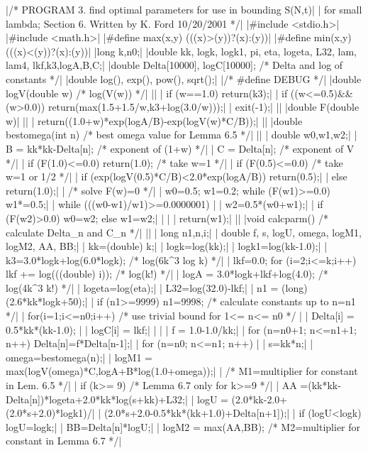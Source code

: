 {\beginlines
|/* PROGRAM 3.  find optimal parameters for use in bounding S(N,t)|
|   for small lambda; Section 6.  Written by K. Ford 10/20/2001 */|
|#include <stdio.h>|
|#include <math.h>|
|#define max(x,y) (((x)>(y))?(x):(y))|
|#define min(x,y) (((x)<(y))?(x):(y))|
|long k,n0;|
|double kk, logk, logk1, pi, eta, logeta, L32, lam, lam4, lkf,k3,logA,B,C;|
|double Delta[10000], logC[10000]; /* Delta and log of constants */|
|double log(), exp(), pow(), sqrt();|
|/* #define DEBUG  */|
|double logV(double w)   /* log(V(w))  */|
|{|
| if (w==1.0) return(k3);|
|  if ((w<=0.5)&&(w>0.0)) return(max(1.5+1.5/w,k3+log(3.0/w)));|
|  exit(-1);|
|}|
|double F(double w)|
|{|
|  return((1.0+w)*exp(logA/B)-exp(logV(w)*C/B));|
|}|
|double bestomega(int n)  /* best omega value for Lemma 6.5 */|
|{|
|  double w0,w1,w2;|
|  B = kk*kk-Delta[n];            /* exponent of (1+w) */|
|  C = Delta[n];                  /* exponent of V     */|
|  if (F(1.0)<=0.0) return(1.0);  /* take w=1          */|
|  if (F(0.5)<=0.0) {             /* take w=1 or 1/2   */|
|    if (exp(logV(0.5)*C/B)<2.0*exp(logA/B)) return(0.5);|
|    else return(1.0);|
|  }                              /* solve F(w)=0 */|
|  w0=0.5; w1=0.2; while (F(w1)>=0.0) w1*=0.5;|
|  while (((w0-w1)/w1)>=0.0000001) {|
|    w2=0.5*(w0+w1);|
|    if (F(w2)>0.0) w0=w2; else w1=w2;|
|  }|
|  return(w1);|
|}|
|void calcparm()   /* calculate Delta_n and C_n */|
|{|
|  long n1,n,i;|
|  double f, s, logU, omega, logM1, logM2, AA, BB;|
|  kk=(double) k;|
|  logk=log(kk);|
|  logk1=log(kk-1.0);|
|  k3=3.0*logk+log(6.0*logk);  /* log(6k^3 log k) */|
|  lkf=0.0; for (i=2;i<=k;i++) lkf += log(((double) i));  /* log(k!) */|
|  logA = 3.0*logk+lkf+log(4.0);  /* log(4k^3 k!)   */|
|  logeta=log(eta);|
|  L32=log(32.0)-lkf;|
|  n1 = (long) (2.6*kk*logk+50);|
|  if (n1>=9999) n1=9998;  /* calculate constants up to n=n1    */|
|  for(i=1;i<=n0;i++) {    /* use trivial bound for 1<= n<= n0  */ |
|    Delta[i] = 0.5*kk*(kk-1.0); |
|    logC[i] = lkf;|
|  }|
|  f = 1.0-1.0/kk;|
|  for (n=n0+1; n<=n1+1; n++) Delta[n]=f*Delta[n-1];|
|  for (n=n0; n<=n1; n++) {|
|    s=kk*n;|
|    omega=bestomega(n);|
|    logM1 = max(logV(omega)*C,logA+B*log(1.0+omega));|
|                     /* M1=multiplier for constant in Lem. 6.5 */|
|    if (k>= 9) {     /* Lemma 6.7 only for k>=9  */|
|      AA =(kk*kk-Delta[n])*logeta+2.0*kk*log(s+kk)+L32;|
|      logU = (2.0*kk-2.0+(2.0*s+2.0)*logk1)/|
|        (2.0*s+2.0-0.5*kk*(kk+1.0)+Delta[n+1]);|
|      if (logU<logk) logU=logk;|
|      BB=Delta[n]*logU;|
|      logM2 = max(AA,BB);   /* M2=multiplier for constant in Lemma 6.7 */|
}}}}
